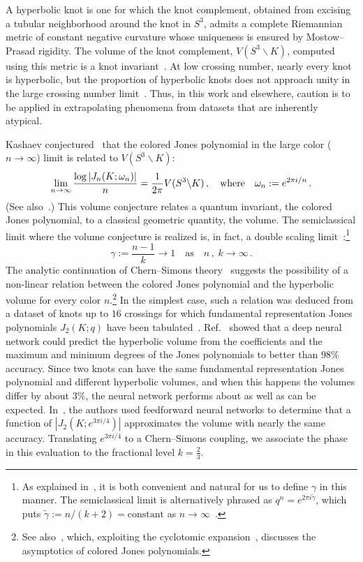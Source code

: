 \documentclass[11pt]{article}
\begin{document}
A hyperbolic knot is one for which the knot complement, obtained from excising a tubular neighborhood around the knot in $S^3$, admits a complete Riemannian metric of constant negative curvature whose uniqueness is ensured by Mostow--Prasad rigidity.
The volume of the knot complement, $V(S^3\backslash K)$, computed using this metric is a knot invariant~\cite{thurston_geometry_topology_three_manifolds}.
At low crossing number, nearly every knot is hyperbolic, but the proportion of hyperbolic knots does not approach unity in the large crossing number limit~\cite{belousov2019hyperbolicknotsgeneric}.
Thus, in this work and elsewhere, caution is to be applied in extrapolating phenomena from datasets that are inherently atypical.

Kashaev conjectured~\cite{kashaev1995link} that the colored Jones polynomial in the large color ($n\to\infty$) limit is related to $V(S^3\backslash K)$:
\begin{equation}\label{eq:vc}
	\lim_{n\to\infty} \frac{\log|J_n(K;\omega_n)|}n = \frac1{2\pi} V(S^3\backslash K) \,, \quad \text{where} \quad \omega_n := e^{2\pi i/n} \,.
\end{equation}
(See also~\cite{murakami2001colored, Gukov:2003na}.)
This volume conjecture relates a quantum invariant, the colored Jones polynomial, to a classical geometric quantity, the volume.
The semiclassical limit where the volume conjecture is realized is, in fact, a double scaling limit~\cite{witten2011analytic}:\footnote{
As explained in~\cite{Craven:2020bdz}, it is both convenient and natural for us to define $\gamma$ in this manner.
The semiclassical limit is alternatively phrased as $q^n = e^{2\pi i \widetilde\gamma}$, which puts $\widetilde\gamma := n/(k+2) = \text{constant}$ as $n\to\infty$~\cite{witten2011analytic}.
}
\begin{equation}
\gamma := \frac{n-1}{k} \to 1 \quad \text{as} \quad n\,,\; k \to\infty \,.
\end{equation}
The analytic continuation of Chern--Simons theory~\cite{witten2011analytic} suggests the possibility of a non-linear relation between the colored Jones polynomial and the hyperbolic volume for every color $n$.\footnote{
See also~\cite{Garoufalidis_2011}, which, exploiting the cyclotomic expansion~\cite{Habiro_2007}, discusses the asymptotics of colored Jones polynomials.}
In the simplest case, such a relation was deduced from a dataset of knots up to $16$ crossings for which fundamental representation Jones polynomials $J_2(K;q)$ have been tabulated~\cite{KnotAtlas,linkinfo,SnapPy}.
Ref.~\cite{Jejjala:2019kio} showed that a deep neural network could predict the hyperbolic volume from the coefficients and the maximum and minimum degrees of the Jones polynomials to better than $98\%$ accuracy.
Since two knots can have the same fundamental representation Jones polynomial and different hyperbolic volumes, and when this happens the volumes differ by about $3\%$, the neural network performs about as well as can be expected.
In~\cite{Craven:2020bdz}, the authors used feedforward neural networks to determine that a function of $|J_2(K; e^{3\pi i/4})|$ approximates the volume with nearly the same accuracy.
Translating $e^{3\pi i/4}$ to a Chern--Simons coupling, we associate the phase in this evaluation to the fractional level $k=\frac23$.
\end{document}
